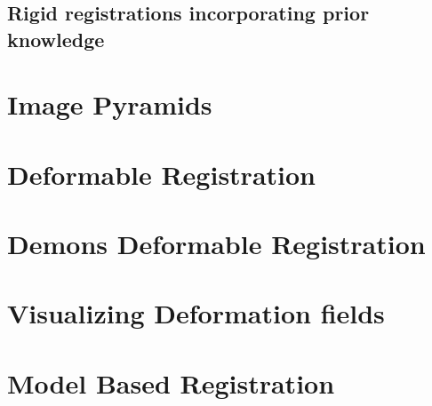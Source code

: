 \subsection{Rigid registrations incorporating prior knowledge}
\label{sec:RegistrationCentered2DTransform}
\ifitkFullVersion

\fi
\clearpage

\section{Image Pyramids}
\label{sec:ImagePyramids}
\ifitkFullVersion

\fi


\clearpage

\section{Deformable Registration}
\label{sec:DeformableRegistration}
\ifitkFullVersion

\fi

\clearpage

\section{Demons Deformable Registration}
\label{sec:DemonsDeformableRegistration}
\ifitkFullVersion

\fi

\section{Visualizing Deformation fields}
\label{sec:VisualizingDeformationFields}
\ifitkFullVersion

\fi

\ifitkFullVersion

\fi


\clearpage

\section{Model Based Registration}
\label{sec:ModelBasedRegistration}
\ifitkFullVersion

\fi


